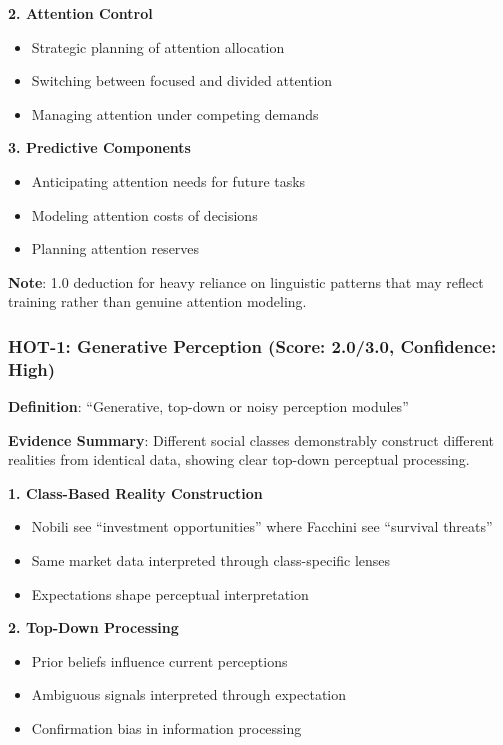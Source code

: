 \documentclass[12pt,a4paper]{article}
\begin{document}
\textbf{2. Attention Control}
\begin{itemize}
    \item Strategic planning of attention allocation
    \item Switching between focused and divided attention
    \item Managing attention under competing demands
\end{itemize}

\textbf{3. Predictive Components}
\begin{itemize}
    \item Anticipating attention needs for future tasks
    \item Modeling attention costs of decisions
    \item Planning attention reserves
\end{itemize}

\textbf{Note}: 1.0 deduction for heavy reliance on linguistic patterns that may reflect training rather than genuine attention modeling.

\subsubsection{HOT-1: Generative Perception (Score: 2.0/3.0, Confidence: High)}

\textbf{Definition}: ``Generative, top-down or noisy perception modules''

\textbf{Evidence Summary}: Different social classes demonstrably construct different realities from identical data, showing clear top-down perceptual processing.

\textbf{1. Class-Based Reality Construction}
\begin{itemize}
    \item Nobili see ``investment opportunities'' where Facchini see ``survival threats''
    \item Same market data interpreted through class-specific lenses
    \item Expectations shape perceptual interpretation
\end{itemize}

\textbf{2. Top-Down Processing}
\begin{itemize}
    \item Prior beliefs influence current perceptions
    \item Ambiguous signals interpreted through expectation
    \item Confirmation bias in information processing
\end{itemize}
\end{document}
